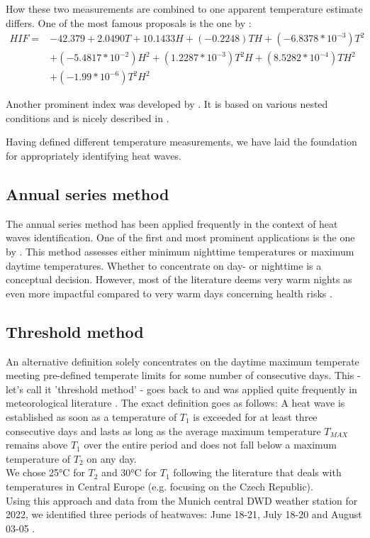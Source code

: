 \documentclass[12pt]{article}
\begin{document}
How these two measurements are combined to one apparent temperature estimate differs. One of the most famous proposals is the one by \citet{el2007}:
\begin{equation}
\begin{aligned}
HIF = & -42.379 + 2.0490 T + 10.1433H + (-0.2248)TH + (-6.8378*10^{-3})T^2 \\
& + (-5.4817*10^{-2})H^2 + (1.2287*10^{-3})T^2H + (8.5282*10^{-4})TH^2 \\
& + (-1.99*10^{-6})T^2H^2
\end{aligned}
\end{equation}

Another prominent index was developed by \citet{nws2011}. It is based on various nested conditions and is nicely described in \citet{anderson2013}.

Having defined different temperature measurements, we have laid the foundation for appropriately identifying heat waves.

\subsection{Annual series method}

The annual series method has been applied frequently in the context of heat waves identification. One of the first and most prominent applications is the one by \citet{karl1997}. This method assesses either minimum nighttime temperatures or maximum daytime temperatures. Whether to concentrate on day- or nighttime is a conceptual decision. However, most of the literature deems very warm nights as even more impactful compared to very warm days concerning health risks \citep{mcmichael1996,henschel1969}. 

\subsection{Threshold method}

An alternative definition solely concentrates on the daytime maximum temperate meeting pre-defined temperate limits for some number of consecutive days. This - let's call it 'threshold method' - goes back to \citet{huth2000} and was applied quite frequently in meteorological literature \citep{meehl2004,kysely2004,kysely2010}. The exact definition goes as follows: A heat wave is established as soon as a temperature of $T_1$ is exceeded for at least three consecutive days and lasts as long as the average maximum temperature $T_{MAX}$ remains above $T_1$ over the entire period and does not fall below a maximum temperature of $T_2$ on any day. \\
We chose 25°C for $T_2$ and 30°C for $T_1$ following the literature that deals with temperatures in Central Europe (e.g. \citet{kysely2004} focusing on the Czech Republic).
\\
Using this approach and data from the Munich central DWD weather station for 2022, we identified three periods of heatwaves: June 18-21, July 18-20 and August 03-05 \citep{loveda2021}.
\end{document}
